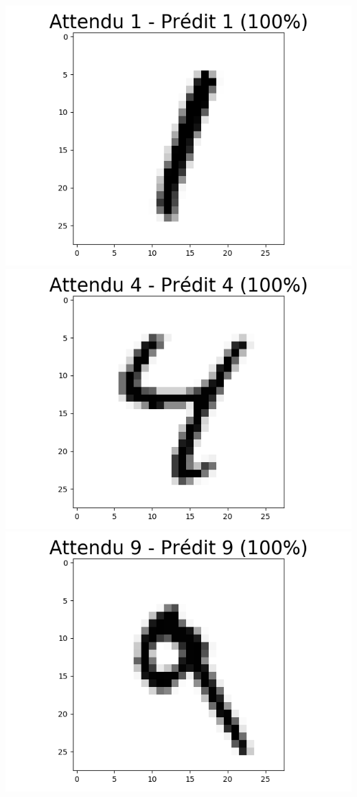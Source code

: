 \documentclass[11pt,class=report,crop=false]{standalone}
\begin{document}
\begin{center}
\includegraphics[scale=\myscale,scale=0.20]{figures/tfconv-chiffre-test-result-5}
\includegraphics[scale=\myscale,scale=0.20]{figures/tfconv-chiffre-test-result-6}
\includegraphics[scale=\myscale,scale=0.20]{figures/tfconv-chiffre-test-result-7}

\end{center}
\end{document}
